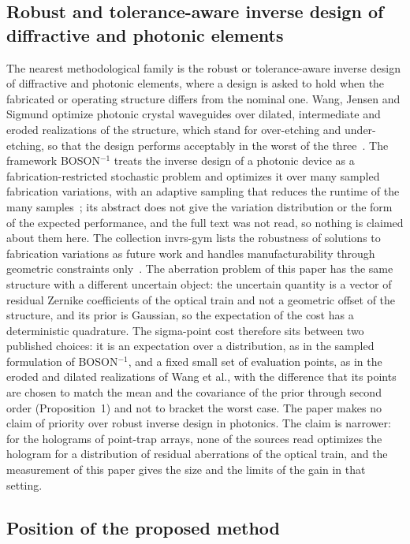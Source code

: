 \subsection{Robust and tolerance-aware inverse design of diffractive and photonic elements}

The nearest methodological family is the robust or tolerance-aware inverse design of diffractive and photonic elements, where a design is asked to hold when the fabricated or operating structure differs from the nominal one. Wang, Jensen and Sigmund optimize photonic crystal waveguides over dilated, intermediate and eroded realizations of the structure, which stand for over-etching and under-etching, so that the design performs acceptably in the worst of the three~\cite{wang2011}. The framework BOSON$^{-1}$ treats the inverse design of a photonic device as a fabrication-restricted stochastic problem and optimizes it over many sampled fabrication variations, with an adaptive sampling that reduces the runtime of the many samples~\cite{ma2024}; its abstract does not give the variation distribution or the form of the expected performance, and the full text was not read, so nothing is claimed about them here. The collection invrs-gym lists the robustness of solutions to fabrication variations as future work and handles manufacturability through geometric constraints only~\cite{schubert2024}.
The aberration problem of this paper has the same structure with a different uncertain object: the uncertain quantity is a vector of residual Zernike coefficients of the optical train and not a geometric offset of the structure, and its prior is Gaussian, so the expectation of the cost has a deterministic quadrature. The sigma-point cost therefore sits between two published choices: it is an expectation over a distribution, as in the sampled formulation of BOSON$^{-1}$, and a fixed small set of evaluation points, as in the eroded and dilated realizations of Wang et al., with the difference that its points are chosen to match the mean and the covariance of the prior through second order (Proposition~1) and not to bracket the worst case. The paper makes no claim of priority over robust inverse design in photonics. The claim is narrower: for the holograms of point-trap arrays, none of the sources read optimizes the hologram for a distribution of residual aberrations of the optical train, and the measurement of this paper gives the size and the limits of the gain in that setting.

\subsection{Position of the proposed method}

